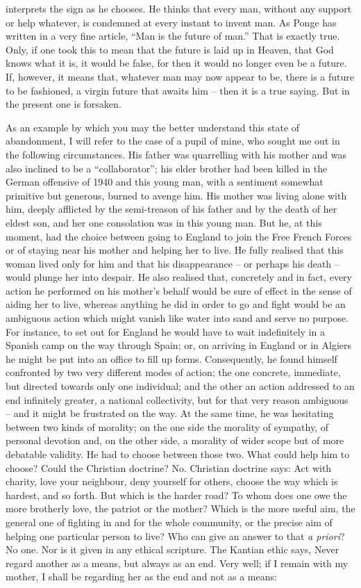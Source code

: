\documentclass[12pt]{article}
\begin{document}
interprets the sign as he chooses. He thinks that every man, without any support or help whatever, is condemned at every instant to invent man. As Ponge has written in a very fine article, “Man is the future of man.” That is exactly true. Only, if one took this to mean that the future is laid up in Heaven, that God knows what it is, it would be false, for then it would no longer even be a future. If, however, it means that, whatever man may now appear to be, there is a future to be fashioned, a virgin future that awaits him – then it is a true saying. But in the present one is forsaken.

As an example by which you may the better understand this state of abandonment, I will refer to the case of a pupil of mine, who sought me out in the following circumstances. His father was quarrelling with his mother and was also inclined to be a “collaborator”; his elder brother had been killed in the German offensive of 1940 and this young man, with a sentiment somewhat primitive but generous, burned to avenge him. His mother was living alone with him, deeply afflicted by the semi-treason of his father and by the death of her eldest son, and her one consolation was in this young man. But he, at this moment, had the choice between going to England to join the Free French Forces or of staying near his mother and helping her to live. He fully realised that this woman lived only for him and that his disappearance – or perhaps his death – would plunge her into despair. He also realised that, concretely and in fact, every action he performed on his mother’s behalf would be sure of effect in the sense of aiding her to live, whereas anything he did in order to go and fight would be an ambiguous action which might vanish like water into sand and serve no purpose. For instance, to set out for England he would have to wait indefinitely in a Spanish camp on the way through Spain; or, on arriving in England or in Algiers he might be put into an office to fill up forms. Consequently, he found himself confronted by two very different modes of action; the one concrete, immediate, but directed towards only one individual; and the other an action addressed to an end infinitely greater, a national collectivity, but for that very reason ambiguous – and it might be frustrated on the way. At the same time, he was hesitating between two kinds of morality; on the one side the morality of sympathy, of personal devotion and, on the other side, a morality of wider scope but of more debatable validity. He had to choose between those two. What could help him to choose? Could the Christian doctrine? No. Christian doctrine says: Act with charity, love your neighbour, deny yourself for others, choose the way which is hardest, and so forth. But which is the harder road? To whom does one owe the more brotherly love, the patriot or the mother? Which is the more useful aim, the general one of fighting in and for the whole community, or the precise aim of helping one particular person to live? Who can give an answer to that \textit{a priori}? No one. Nor is it given in any ethical scripture. The Kantian ethic says, Never regard another as a means, but always as an end. Very well; if I remain with my mother, I shall be regarding her as the end and not as a means: 
\end{document}
